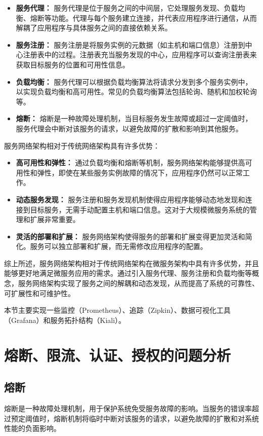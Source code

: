 \begin{itemize}
	\item \textbf{服务代理： }服务代理是位于服务之间的中间层，它处理服务发现、负载均衡、熔断等功能。代理与每个服务建立连接，并代表应用程序进行通信，从而解耦了应用程序与具体服务之间的直接依赖关系。
	\item \textbf{服务注册： }服务注册是将服务实例的元数据（如主机和端口信息）注册到中心注册表中的过程。注册表充当服务发现的中心，应用程序可以查询注册表来获取目标服务的位置和可用性信息。
	\item \textbf{负载均衡： }服务代理可以根据负载均衡算法将请求分发到多个服务实例中，以实现负载均衡和高可用性。常见的负载均衡算法包括轮询、随机和加权轮询等。
	\item \textbf{熔断：} 熔断是一种故障处理机制，当目标服务发生故障或超过一定阈值时，服务代理会中断对该服务的请求，以避免故障的扩散和影响到其他服务。
\end{itemize}

服务网络架构相对于传统网络架构具有许多优势：

\begin{itemize}
	\item \textbf{高可用性和弹性：} 通过负载均衡和熔断等机制，服务网络架构能够提供高可用性和弹性，即使在某些服务实例故障的情况下，应用程序仍然可以正常工作。
	\item \textbf{动态服务发现：} 服务注册和服务发现机制使得应用程序能够动态地发现和连接到目标服务，无需手动配置主机和端口信息。这对于大规模微服务系统的管理和扩展非常重要。
	\item \textbf{灵活的部署和扩展： }服务网络架构使得服务的部署和扩展变得更加灵活和简化。服务可以独立部署和扩展，而无需修改应用程序的配置。
\end{itemize}

综上所述，服务网络架构相对于传统网络架构在微服务架构中具有许多优势，并且能够更好地满足微服务应用的需求。通过引入服务代理、服务注册和负载均衡等概念，服务网络架构实现了服务之间的解耦和动态发现，从而提高了系统的可靠性、可扩展性和可维护性。

本节主要实现一些监控（Prometheus）、追踪（Zipkin）、数据可视化工具（Grafana）和服务拓扑结构（Kiali）。
\section{熔断、限流、认证、授权的问题分析}
\subsection{熔断}
熔断是一种故障处理机制，用于保护系统免受服务故障的影响。当服务的错误率超过预定阈值时，熔断机制将临时中断对该服务的请求，以避免故障的扩散和对系统性能的负面影响。

